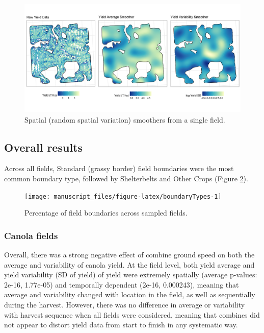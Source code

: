 \documentclass[]{elsarticle} %
\begin{document}
\begin{figure}
\includegraphics[width=1\linewidth]{../Figures/ExamplePlots/spatialSmooths} \caption{Spatial (random spatial variation) smoothers from a single field.}\label{fig:spatialSmooths}
\end{figure}

\hypertarget{overall-results}{%
\subsection{Overall results}\label{overall-results}}

Across all fields, Standard (grassy border) field boundaries were the most common boundary type, followed by Shelterbelts and Other Crops (Figure \ref{fig:boundaryTypes}).

\begin{figure}
\texttt{[image: manuscript\_files/figure-latex/boundaryTypes-1]} \caption{Percentage of field boundaries across sampled fields.}\label{fig:boundaryTypes}
\end{figure}

\hypertarget{canola-fields}{%
\subsubsection{Canola fields}\label{canola-fields}}

Overall, there was a strong negative effect of combine ground speed on both the average and variability of canola yield.
At the field level, both yield average and yield variability (SD of yield) of yield were extremely spatially (average p-values: 2e-16, 1.77e-05) and temporally dependent (2e-16, 0.000243), meaning that average and variability changed with location in the field, as well as sequentially during the harvest.
However, there was no difference in average or variability with harvest sequence when all fields were considered, meaning that combines did not appear to distort yield data from start to finish in any systematic way.
\end{document}
